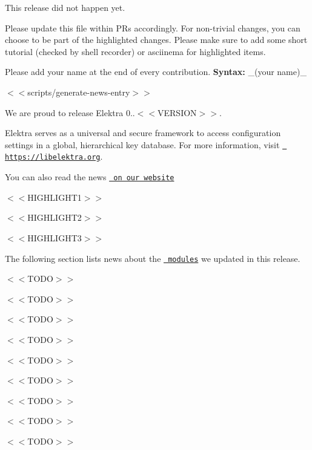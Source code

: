 This release did not happen yet.

Please update this file within P\+Rs accordingly. For non-\/trivial changes, you can choose to be part of the highlighted changes. Please make sure to add some short tutorial (checked by shell recorder) or asciinema for highlighted items.

Please add your name at the end of every contribution. {\bfseries{Syntax\+:}} \+\_\+(your name)\+\_\+

$<$$<${\ttfamily scripts/generate-\/news-\/entry}$>$$>$

We are proud to release Elektra 0..$<$$<$\+V\+E\+R\+S\+I\+O\+N$>$$>$.

Elektra serves as a universal and secure framework to access configuration settings in a global, hierarchical key database. For more information, visit \href{https://libelektra.org}{\texttt{ https\+://libelektra.\+org}}.

You can also read the news \href{https://www.libelektra.org/news/0.9.<<VERSION>>-release}{\texttt{ on our website}}


\begin{DoxyItemize}
\item $<$$<$\+H\+I\+G\+H\+L\+I\+G\+H\+T1$>$$>$
\item $<$$<$\+H\+I\+G\+H\+L\+I\+G\+H\+T2$>$$>$
\item $<$$<$\+H\+I\+G\+H\+L\+I\+G\+H\+T3$>$$>$
\end{DoxyItemize}

The following section lists news about the \href{https://www.libelektra.org/plugins/readme}{\texttt{ modules}} we updated in this release.


\begin{DoxyItemize}
\item $<$$<$\+T\+O\+D\+O$>$$>$
\item $<$$<$\+T\+O\+D\+O$>$$>$
\item $<$$<$\+T\+O\+D\+O$>$$>$
\end{DoxyItemize}


\begin{DoxyItemize}
\item $<$$<$\+T\+O\+D\+O$>$$>$
\item $<$$<$\+T\+O\+D\+O$>$$>$
\item $<$$<$\+T\+O\+D\+O$>$$>$
\end{DoxyItemize}


\begin{DoxyItemize}
\item $<$$<$\+T\+O\+D\+O$>$$>$
\item $<$$<$\+T\+O\+D\+O$>$$>$
\item $<$$<$\+T\+O\+D\+O$>$$>$
\end{DoxyItemize}

